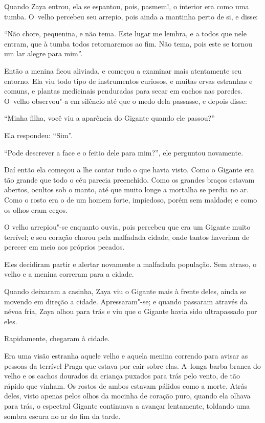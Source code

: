 Quando Zaya entrou, ela se espantou, pois, pasmem!, o interior era como
uma tumba. O~velho percebeu seu arrepio, pois ainda a mantinha perto de
si, e disse:

``Não chore, pequenina, e não tema. Este lugar me lembra, e a todos que
nele entram, que à tumba todos retornaremos ao fim. Não tema, pois este
se tornou um lar alegre para mim''.

Então a menina ficou aliviada, e começou a examinar mais atentamente seu
entorno. Ela viu todo tipo de instrumentos curiosos, e muitas ervas
estranhas e comuns, e plantas medicinais penduradas para secar em cachos
nas paredes. O~velho observou"-a em silêncio até que o medo dela
passasse, e depois disse:

``Minha filha, você viu a aparência do Gigante quando ele passou?''

Ela respondeu: ``Sim''.

``Pode descrever a face e o feitio dele para mim?'', ele perguntou
novamente.

Daí então ela começou a lhe contar tudo o que havia visto. Como o
Gigante era tão grande que todo o céu parecia preenchido. Como os
grandes braços estavam abertos, ocultos sob o manto, até que muito longe
a mortalha se perdia no ar. Como o rosto era o de um homem forte,
impiedoso, porém sem maldade; e como os olhos eram cegos.

O velho arrepiou"-se enquanto ouvia, pois percebeu que era um Gigante
muito terrível; e seu coração chorou pela malfadada cidade, onde tantos
haveriam de perecer em meio aos próprios pecados.

Eles decidiram partir e alertar novamente a malfadada população. Sem
atraso, o velho e a menina correram para a cidade.

Quando deixaram a casinha, Zaya viu o Gigante mais à frente deles, ainda
se movendo em direção a cidade. Apressaram"-se; e quando passaram através
da névoa fria, Zaya olhou para trás e viu que o Gigante havia sido
ultrapassado por eles.

Rapidamente, chegaram à cidade.

Era uma visão estranha aquele velho e aquela menina correndo para avisar
as pessoas da terrível Praga que estava por cair sobre elas. A~longa
barba branca do velho e os cachos dourados da criança puxados para trás pelo vento,
de tão rápido que vinham. Os rostos de ambos estavam pálidos
como a morte. Atrás deles, visto apenas pelos olhos da mocinha de
coração puro, quando ela olhava para trás, o espectral Gigante
continuava a avançar lentamente, toldando uma sombra escura no ar do
fim da tarde.

